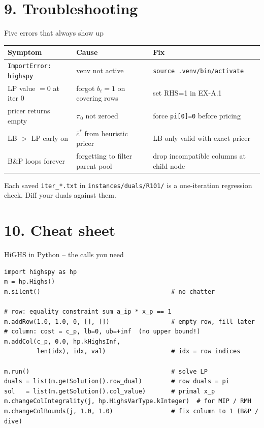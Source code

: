 \documentclass[10pt,aspectratio=169]{beamer}
\newcommand{\redcost}{\bar{c}}
\begin{document}
\section{9. Troubleshooting}

\begin{frame}[fragile]{Five errors that always show up}
  \scriptsize
  \begin{tabular}{@{}p{}p{}p{}@{}}
    \toprule
    Symptom & Cause & Fix \\
    \midrule
    \texttt{ImportError: highspy} & venv not active &
       \texttt{source .venv/bin/activate} \\
    LP value $=0$ at iter 0 & forgot $b_i=1$ on covering rows &
       set RHS=1 in EX-A.1 \\
    pricer returns empty & $\pi_0$ not zeroed &
       force \texttt{pi[0]=0} before pricing \\
    LB $>$ LP early on & $\redcost^*$ from heuristic pricer &
       LB only valid with exact pricer \\
    B\&P loops forever & forgetting to filter parent pool &
       drop incompatible columns at child node \\
    \bottomrule
  \end{tabular}
  \medskip
  \begin{tipbox}
    Each saved \texttt{iter\_*.txt} in \texttt{instances/duals/R101/} is a
    one-iteration regression check. Diff your duals against them.
  \end{tipbox}
\end{frame}

\section{10. Cheat sheet}

\begin{frame}[fragile]{HiGHS in Python -- the calls you need}
\begin{lstlisting}
import highspy as hp
m = hp.Highs()
m.silent()                                    # no chatter

# row: equality constraint sum a_ip * x_p == 1
m.addRow(1.0, 1.0, 0, [], [])                 # empty row, fill later
# column: cost = c_p, lb=0, ub=+inf  (no upper bound!)
m.addCol(c_p, 0.0, hp.kHighsInf,
         len(idx), idx, val)                  # idx = row indices

m.run()                                       # solve LP
duals = list(m.getSolution().row_dual)        # row duals = pi
sol   = list(m.getSolution().col_value)       # primal x_p
m.changeColIntegrality(j, hp.HighsVarType.kInteger)  # for MIP / RMH
m.changeColBounds(j, 1.0, 1.0)                # fix column to 1 (B&P / dive)
\end{lstlisting}
\end{frame}
\end{document}
